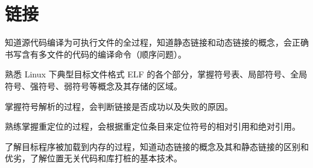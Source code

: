 \chapter{链接}
    \begin{summary}
        \begin{compactitem}
            \item 知道源代码编译为可执行文件的全过程，知道静态链接和动态链接的概念，会正确书写含有多文件的代码的编译命令（顺序问题）。
            \item 熟悉 Linux 下典型目标文件格式 ELF 的各个部分，掌握符号表、局部符号、全局符号、强符号、弱符号等概念及其存储的区域。
            \item 掌握符号解析的过程，会判断链接是否成功以及失败的原因。
            \item 熟练掌握重定位的过程，会根据重定位条目来定位符号的相对引用和绝对引用。
            \item 了解目标程序被加载到内存的过程，知道动态链接的概念及其和静态链接的区别和优劣，了解位置无关代码和库打桩的基本技术。
        \end{compactitem}
    \end{summary}

